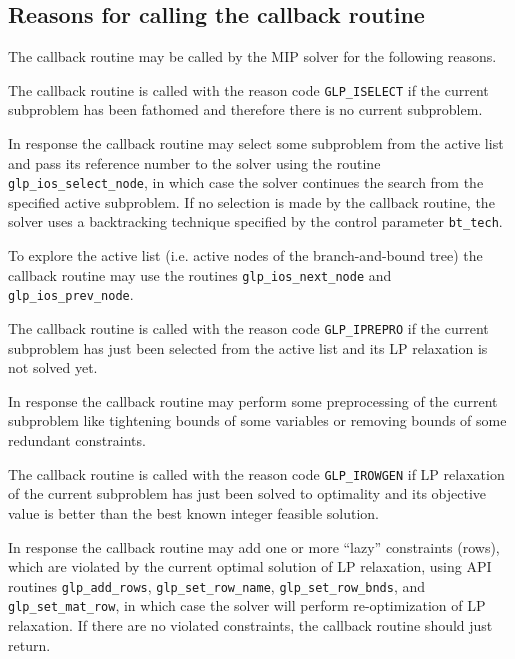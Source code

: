 \subsection{Reasons for calling the callback routine}

The callback routine may be called by the MIP solver for the following
reasons.


The callback routine is called with the reason code \verb|GLP_ISELECT|
if the current subproblem has been fathomed and therefore there is no
current subproblem.

In response the callback routine may select some subproblem from the
active list and pass its reference number to the solver using the
routine \verb|glp_ios_select_node|, in which case the solver continues
the search from the specified active subproblem. If no selection is
made by the callback routine, the solver uses a backtracking technique
specified by the control parameter \verb|bt_tech|.

To explore the active list (i.e. active nodes of the branch-and-bound
tree) the callback routine may use the routines \verb|glp_ios_next_node|
and \verb|glp_ios_prev_node|.


The callback routine is called with the reason code \verb|GLP_IPREPRO|
if the current subproblem has just been selected from the active list
and its LP relaxation is not solved yet.

In response the callback routine may perform some preprocessing of the
current subproblem like tightening bounds of some variables or removing
bounds of some redundant constraints.


The callback routine is called with the reason code \verb|GLP_IROWGEN|
if LP relaxation of the current subproblem has just been solved to
optimality and its objective value is better than the best known
integer feasible solution.

In response the callback routine may add one or more ``lazy''
constraints (rows), which are violated by the current optimal solution
of LP relaxation, using API routines \verb|glp_add_rows|,
\verb|glp_set_row_name|, \verb|glp_set_row_bnds|, and
\verb|glp_set_mat_row|, in which case the solver will perform
re-optimization of LP relaxation. If there are no violated constraints,
the callback routine should just return.


